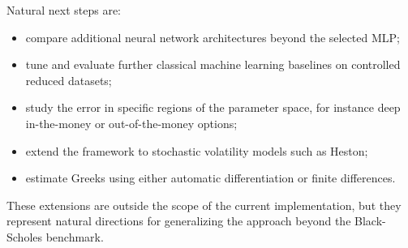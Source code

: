 Natural next steps are:

\begin{itemize}
    \item compare additional neural network architectures beyond the selected MLP;
    \item tune and evaluate further classical machine learning baselines on controlled reduced datasets;
    \item study the error in specific regions of the parameter space, for instance deep in-the-money or out-of-the-money options;
    \item extend the framework to stochastic volatility models such as Heston;
    \item estimate Greeks using either automatic differentiation or finite differences.
\end{itemize}

These extensions are outside the scope of the current implementation, but they represent natural directions for generalizing the approach beyond the Black-Scholes benchmark.
